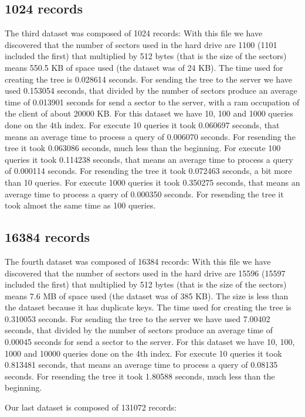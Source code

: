 \subsection{1024 records}
The third dataset was composed of 1024 records:
With this file we have discovered that the number of sectors used in the hard drive are 1100 (1101 included the first) that multiplied by 512 bytes (that is the size of the sectors) means 550.5 KB of space used (the dataset was of 24 KB).
The time used for creating the tree is 0.028614 seconds.
For sending the tree to the server we have used 0.153054 seconds, that divided by the number of sectors produce an average time of 0.013901 seconds for send a sector to the server, with a ram occupation of the client of about 20000 KB.
For this dataset we have 10, 100 and 1000 queries done on the 4th index. 
For execute 10 queries it took 0.060697 seconds, that means an average time to process a query of 0.006070 seconds.
For resending the tree it took 0.063086 seconds, much less than the beginning.
For execute 100 queries it took 0.114238 seconds, that means an average time to process a query of 0.000114 seconds.
For resending the tree it took 0.072463 seconds, a bit more than 10 queries.
For execute 1000 queries it took 0.350275 seconds, that means an average time to process a query of 0.000350 seconds.
For resending the tree it took almost the same time as 100 queries.

\subsection{16384 records}
The fourth dataset was composed of 16384 records:
With this file we have discovered that the number of sectors used in the hard drive are 15596 (15597 included the first) that multiplied by 512 bytes (that is the size of the sectors) means 7.6 MB of space used (the dataset was of 385 KB).
The size is less than the dataset because it has duplicate keys.
The time used for creating the tree is 0.310053 seconds.
For sending the tree to the server we have used 7.00402 seconds, that divided by the number of sectors produce an average time of 0.00045 seconds for send a sector to the server.
For this dataset we have 10, 100, 1000 and 10000 queries done on the 4th index. 
For execute 10 queries it took 0.813481 seconds, that means an average time to process a query of 0.08135 seconds.
For resending the tree it took 1.80588 seconds, much less than the beginning.



Our last dataset is composed of 131072 records:

